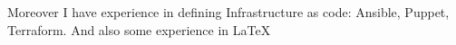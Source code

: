 Moreover I have experience in defining Infrastructure as code: Ansible,
  Puppet, Terraform. And also some experience in \LaTeX
